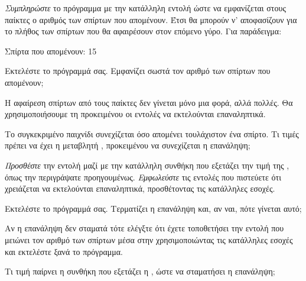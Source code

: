 \documentclass[a4paper,11pt,oneside]{book}
\begin{document}
\begin{step}
\emph{Συμπληρώστε} το πρόγραμμα με την κατάλληλη εντολή ώστε να εμφανίζεται στους παίκτες ο αριθμός των σπίρτων που απομένουν. Έτσι θα μπορούν ν' αποφασίζουν για το πλήθος των σπίρτων που θα αφαιρέσουν στον επόμενο γύρο. Για παράδειγμα:

\marginnote[14pt]{\iconcomputer}
\begin{pyterm}
Σπίρτα που απομένουν: 15
\end{pyterm}

Εκτελέστε το πρόγραμμά σας. Εμφανίζει σωστά τον αριθμό των σπίρτων που απομένουν;

\marginnote[14pt]{\icondiscuss}
\dottedline
\end{step}

\begin{step}
Η αφαίρεση σπίρτων από τους παίκτες δεν γίνεται μόνο μια φορά, αλλά πολλές. Θα χρησιμοποιήσουμε τη  προκειμένου οι εντολές να εκτελούνται επαναληπτικά.

Το συγκεκριμένο παιχνίδι συνεχίζεται όσο απομένει τουλάχιστον ένα σπίρτο. Τι τιμές πρέπει να έχει η μεταβλητή , προκειμένου να συνεχίζεται η επανάληψη;

\marginnote[14pt]{\icondiscuss}
\dottedline

\emph{Προσθέστε} την εντολή  μαζί με την κατάλληλη συνθήκη που εξετάζει την τιμή της , όπως την περιγράψατε προηγουμένως. \emph{Εμφωλεύστε} τις εντολές που πιστεύετε ότι χρειάζεται να εκτελούνται επαναληπτικά, προσθέτοντας τις κατάλληλες εσοχές.

Εκτελέστε το πρόγραμμά σας. Τερματίζει η επανάληψη και, αν ναι, πότε γίνεται αυτό; 

\marginnote[14pt]{\icondiscuss}
\dottedline

\marginnote[16pt]{\iconcaution}
Αν η επανάληψη δεν σταματά τότε ελέγξτε ότι έχετε τοποθετήσει την εντολή που μειώνει τον αριθμό των σπίρτων  μέσα στην  χρησιμοποιώντας τις κατάλληλες εσοχές και εκτελέστε ξανά το πρόγραμμα. 

Τι τιμή παίρνει η συνθήκη που εξετάζει η , ώστε να σταματήσει η επανάληψη;

\marginnote[14pt]{\icondiscuss}
\dottedline
\end{step}
\end{document}
